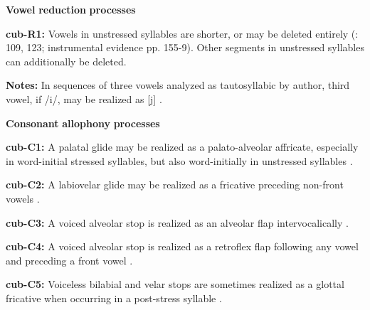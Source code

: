 \begin{styleBody}
\textbf{Vowel} \textbf{reduction} \textbf{processes}
\end{styleBody}

\begin{styleBody}
\textbf{cub-R1:} Vowels in unstressed syllables are shorter, or may be deleted entirely (\citealt{Chacon2012}: 109, 123; instrumental evidence pp. 155-9). Other segments in unstressed syllables can additionally be deleted.
\end{styleBody}

\begin{styleBody}
\textbf{Notes:} In sequences of three vowels analyzed as tautosyllabic by author, third vowel, if /i/, may be realized as [j] \citep[52]{Chacon2012}.
\end{styleBody}

\begin{styleBody}
\textbf{Consonant} \textbf{allophony} \textbf{processes}
\end{styleBody}

\begin{styleBody}
\textbf{cub-C1:} A palatal glide may be realized as a palato-alveolar affricate, especially in word-initial stressed syllables, but also word-initially in unstressed syllables \citep[67]{Chacon2012}.
\end{styleBody}

\begin{styleBody}
\textbf{cub-C2:} A labiovelar glide may be realized as a fricative preceding non-front vowels \citep[63]{Chacon2012}.
\end{styleBody}

\begin{styleBody}
\textbf{cub-C3:} A voiced alveolar stop is realized as an alveolar flap intervocalically \citep[63]{Chacon2012}.
\end{styleBody}

\begin{styleBody}
\textbf{cub-C4:} A voiced alveolar stop is realized as a retroflex flap following any vowel and preceding a front vowel \citep[6]{Chacon2012}.
\end{styleBody}

\begin{styleBody}
\textbf{cub-C5:} Voiceless bilabial and velar stops are sometimes realized as a glottal fricative when occurring in a post-stress syllable \citep[123]{Chacon2012}.
\end{styleBody}

